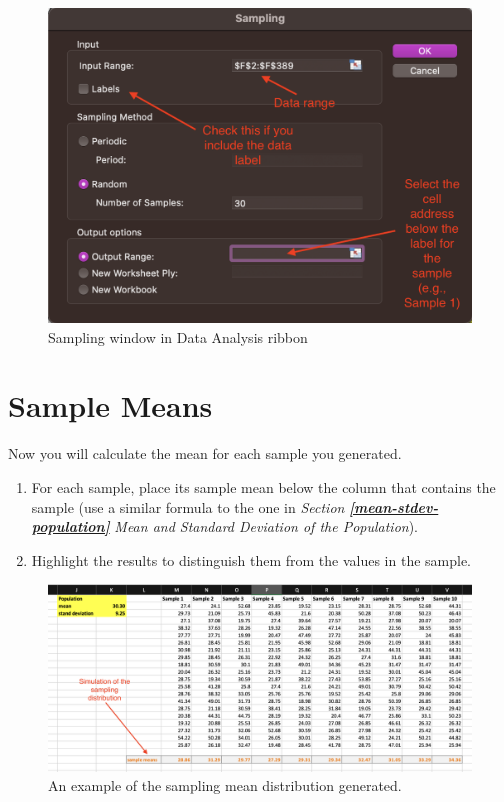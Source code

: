 \documentclass[
]{book}
\providecommand{\tightlist}{%
  \setlength{\itemsep}{0pt}\setlength{\parskip}{0pt}}
\begin{document}
\begin{figure}

{\centering \includegraphics[width=0.75\linewidth]{images/data-analysis-sampling} 

}

\caption{Sampling window in Data Analysis ribbon}\label{fig:data-analysis-sampling}
\end{figure}

\hypertarget{mean-samples}{%
\section{Sample Means}\label{mean-samples}}

Now you will calculate the mean for each sample you generated.

\begin{enumerate}
\def\labelenumi{\arabic{enumi}.}
\tightlist
\item
  For each sample, place its sample mean below the column that contains the sample (use a similar formula to the one in \emph{Section} \textbf{\emph{\ref{mean-stdev-population}}} \emph{Mean and Standard Deviation of the Population}).
\item
  Highlight the results to distinguish them from the values in the sample.
\end{enumerate}

\begin{figure}

{\centering \includegraphics[width=1\linewidth]{images/simualation-sampling-distribution} 

}

\caption{An example of the sampling mean distribution generated.}\label{fig:simualation-sampling-distribution}
\end{figure}
\end{document}
